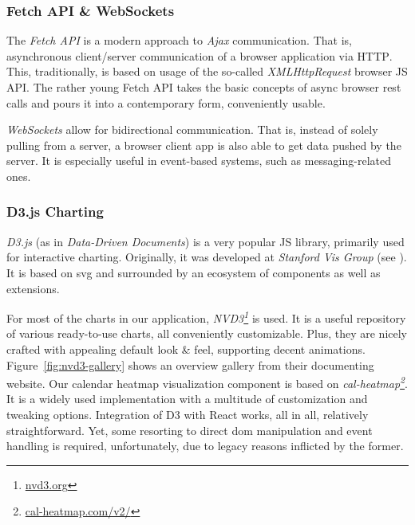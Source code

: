 \subsubsection{Fetch API \& WebSockets}

The \emph{Fetch API} is a modern approach to \emph{Ajax} communication.
That is, asynchronous client/server communication of a browser application via \textsc{HTTP}.
This, traditionally, is based on usage of the so-called \emph{XMLHttpRequest} browser \textsc{JS} \textsc{API}.
The rather young Fetch \textsc{API} takes the basic concepts of async browser \gls{rest} calls and pours it into a contemporary form, conveniently usable.

\emph{WebSockets} allow for bidirectional communication.
That is, instead of solely pulling from a server, a browser client app is also able to get data pushed by the server.
It is especially useful in event-based systems, such as messaging-related ones.

\subsubsection{D3.js Charting}

\emph{D3.js} (as in \emph{Data-Driven Documents}) is a very popular \textsc{JS} library, primarily used for interactive charting.
Originally, it was developed at \emph{Stanford Vis Group} (see \cite{Bostock2011}).
It is based on \gls{svg} and surrounded by an ecosystem of components as well as extensions.

For most of the charts in our application, \emph{NVD3\footnote{\textcolor{blue}{\href{http://nvd3.org/}{nvd3.org}}}} is used.
It is a useful repository of various ready-to-use charts, all conveniently customizable.
Plus, they are nicely crafted with appealing default look \& feel, supporting decent animations.
Figure~\ref{fig:nvd3-gallery} shows an overview gallery from their documenting website.
Our calendar heatmap visualization component is based on \emph{cal-heatmap\footnote{\textcolor{blue}{\href{http://cal-heatmap.com/v2/}{cal-heatmap.com/v2/}}}}.
It is a widely used implementation with a multitude of customization and tweaking options.
Integration of D3 with React works, all in all, relatively straightforward. Yet, some resorting to direct \gls{dom} manipulation and event handling is required, unfortunately, due to legacy reasons inflicted by the former.

